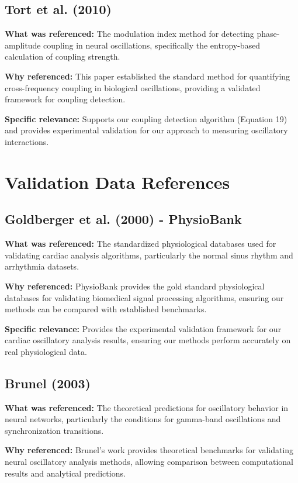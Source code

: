\documentclass{article}
\begin{document}
\subsection{Tort et al. (2010)}

\textbf{What was referenced:} The modulation index method for detecting phase-amplitude coupling in neural oscillations, specifically the entropy-based calculation of coupling strength.

\textbf{Why referenced:} This paper established the standard method for quantifying cross-frequency coupling in biological oscillations, providing a validated framework for coupling detection.

\textbf{Specific relevance:} Supports our coupling detection algorithm (Equation 19) and provides experimental validation for our approach to measuring oscillatory interactions.

\section{Validation Data References}

\subsection{Goldberger et al. (2000) - PhysioBank}

\textbf{What was referenced:} The standardized physiological databases used for validating cardiac analysis algorithms, particularly the normal sinus rhythm and arrhythmia datasets.

\textbf{Why referenced:} PhysioBank provides the gold standard physiological databases for validating biomedical signal processing algorithms, ensuring our methods can be compared with established benchmarks.

\textbf{Specific relevance:} Provides the experimental validation framework for our cardiac oscillatory analysis results, ensuring our methods perform accurately on real physiological data.

\subsection{Brunel (2003)}

\textbf{What was referenced:} The theoretical predictions for oscillatory behavior in neural networks, particularly the conditions for gamma-band oscillations and synchronization transitions.

\textbf{Why referenced:} Brunel's work provides theoretical benchmarks for validating neural oscillatory analysis methods, allowing comparison between computational results and analytical predictions.
\end{document}
